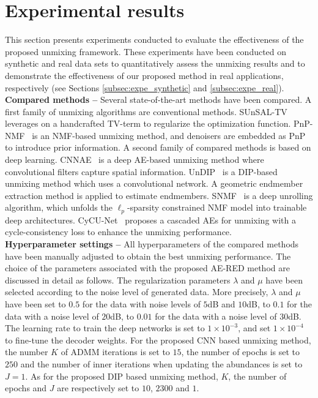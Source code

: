 \documentclass[journal,a4paper]{IEEEtran}
\begin{document}
\section{Experimental results}
\label{sec:experiment}
This section presents experiments conducted to evaluate the effectiveness of the proposed unmixing framework. These experiments have been conducted on  synthetic and real data sets to quantitatively assess the unmixing results and  to demonstrate the effectiveness of our proposed method in real applications, respectively (see Sections \ref{subsec:expe_synthetic} and \ref{subsec:expe_real}). \\

\noindent \textbf{Compared methods -- } Several state-of-the-art methods have been compared. A first family of unmixing algorithms are conventional methods. SUnSAL-TV~\cite{iordache2012total} leverages on a handcrafted TV-term to regularize the optimization function. PnP-NMF~\cite{zhao2021hyperspectralNMF} is an NMF-based unmixing method, and denoisers are embedded as PnP to introduce prior information. A second family of compared methods is based on deep learning. CNNAE~\cite{palsson2020convolutional} is a deep AE-based unmixing method where convolutional filters capture spatial information. UnDIP~\cite{rasti2021undip} is a DIP-based unmixing method which uses a convolutional network. A geometric endmember extraction method is applied to estimate endmembers. SNMF~\cite{xiong2021snmf} is a deep unrolling algorithm, which unfolds the $\ell_p$-sparsity constrained NMF model into trainable deep architectures. CyCU-Net~\cite{gao2021cycu} proposes a cascaded AEs for unmixing with a cycle-consistency loss to enhance the unmixing performance.\\



\noindent \textbf{Hyperparameter settings -- }
All hyperparameters of the compared methods have been manually adjusted to obtain the best unmixing performance. The choice of the parameters associated with the proposed AE-RED method are discussed in detail as follows. The regularization parameters $\lambda$ and $\mu$ have been selected according to the noise level of generated data. More precisely,  $\lambda$ and  $\mu$ have been set to $0.5$ for the data with noise levels of $5$dB and $10$dB, to $0.1$ for the data with a noise level of $20$dB, to $0.01$ for the data with a noise level of $30$dB.
The learning rate to train the deep networks is set to $1\times10^{-3}$, and set $1\times10^{-4}$ to fine-tune the decoder weights. For the proposed CNN based unmixing method, the number $K$ of ADMM iterations is set to $15$, the number of epochs is set to $250$ and the number of inner iterations when updating the abundances is set to $J=1$. As for the proposed DIP based unmixing method, $K$, the number of epochs and $J$ are respectively set to $10$, $2300$ and $1$.\\
\end{document}

